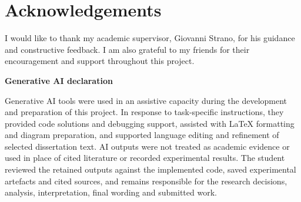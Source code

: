 \chapter*{Acknowledgements}

I would like to thank my academic supervisor, Giovanni Strano, for his
guidance and constructive feedback. I am also grateful to my friends for their
encouragement and support throughout this project.

\vspace{0.8cm}
\noindent\textbf{Generative AI declaration}

Generative AI tools were used in an assistive capacity during the development
and preparation of this project. In response to task-specific instructions,
they provided code solutions and debugging support, assisted with LaTeX
formatting and diagram preparation, and supported language editing and
refinement of selected dissertation text. AI outputs were not treated as
academic evidence or used in place of cited literature or recorded
experimental results. The student reviewed the retained outputs against the
implemented code, saved experimental artefacts and cited sources, and remains
responsible for the research decisions, analysis, interpretation, final wording
and submitted work.

\clearpage
